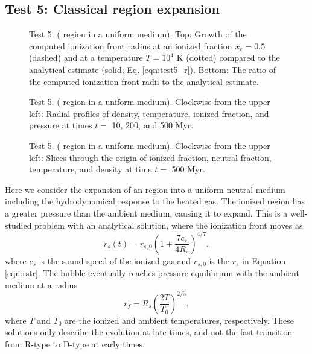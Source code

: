 \documentclass[12pt,preprint]{aastex}
\begin{document}
\subsection{Test 5: Classical  region expansion}
\label{sec:test5}

\begin{figure}[t]
  \caption{\label{fig:test5_1} Test 5. ( region in a uniform
    medium).  Top: Growth of the computed ionization front radius at
    an ionized fraction $x_e = 0.5$ (dashed) and at a temperature $T =
    10^4$ K (dotted) compared to the analytical estimate (solid;
    Eq. \ref{eqn:test5_r}).  Bottom: The ratio of the computed
    ionization front radii to the analytical estimate.} 
\end{figure}

\begin{figure}[t]
  \caption{\label{fig:test5_2} Test 5. ( region in a uniform
    medium).  Clockwise from the upper left: Radial profiles of
    density, temperature, ionized fraction, and pressure at times $t
    =$ 10, 200, and 500 Myr.}
\end{figure}

\begin{figure}[t]
  \caption{\label{fig:test5_3} Test 5. ( region in a uniform
    medium).  Clockwise from the upper left: Slices through the origin
    of ionized fraction, neutral fraction, temperature, and density at
    time $t =$ 500 Myr.}
\end{figure}

Here we consider the expansion of an  region into a uniform
neutral medium including the hydrodynamical response to the heated
gas.  The ionized region has a greater pressure than the ambient
medium, causing it to expand.  This is a well-studied problem
\citep{Spitzer78} with an analytical solution, where the ionization
front moves as
%
\begin{equation}
  \label{eqn:test5_r}
  r_s(t) = r_{s,0} \left(1 + \frac{7c_s}{4R_s}\right)^{4/7},
\end{equation}
where $c_s$ is the sound speed of the ionized gas and $r_{s,0}$ is the
$r_s$ in Equation \ref{eqn:rstr}.  The bubble eventually reaches
pressure equilibrium with the ambient medium at a radius
%
\begin{equation}
  \label{eqn:test5_final}
  r_f = R_s \left(\frac{2T}{T_0}\right)^{2/3},
\end{equation}
where $T$ and $T_0$ are the ionized and ambient temperatures,
respectively.  These solutions only describe the evolution at late
times, and not the fast transition from R-type to D-type at early
times.
\end{document}
